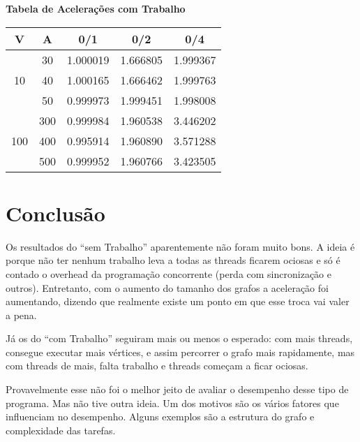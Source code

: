 \documentclass[12pt]{article}
\newcommand{\tb}{\textbf}
\begin{document}
\begin{center}
	\tb{Tabela de Acelerações com Trabalho}
\begin{tabular}{|c|c||c|c|c|}
	\hline
	V & A & 0/1 & 0/2 & 0/4 \\
	\hline
	   & 30 & 1.000019 & 1.666805 & 1.999367 \\
	10 & 40 & 1.000165 & 1.666462 & 1.999763 \\
	   & 50 & 0.999973 & 1.999451 & 1.998008 \\
	\hline
	    & 300 & 0.999984 & 1.960538 & 3.446202 \\
	100 & 400 & 0.995914 & 1.960890 & 3.571288 \\
	    & 500 & 0.999952 & 1.960766 & 3.423505 \\
	\hline
\end{tabular}\end{center}

\newpage
\section{Conclusão}

Os resultados do ``sem Trabalho''
aparentemente não foram muito bons.
A ideia é porque não ter nenhum trabalho
leva a todas as threads ficarem ociosas
e só é contado o overhead da programação concorrente
(perda com sincronização e outros).
Entretanto, com o aumento do tamanho dos grafos
a aceleração foi aumentando,
dizendo que realmente existe um ponto em que
esse troca vai valer a pena.

Já os do ``com Trabalho'' seguiram
mais ou menos o esperado:
com mais threads,
consegue executar mais vértices,
e assim percorrer o grafo mais rapidamente,
mas com threads de mais,
falta trabalho e threads começam a ficar ociosas.

Provavelmente esse não foi o melhor jeito de
avaliar o desempenho desse tipo de programa.
Mas não tive outra ideia.
Um dos motivos são os vários fatores que
influenciam no desempenho.
Alguns exemplos são a estrutura do grafo
e complexidade das tarefas.
\end{document}
